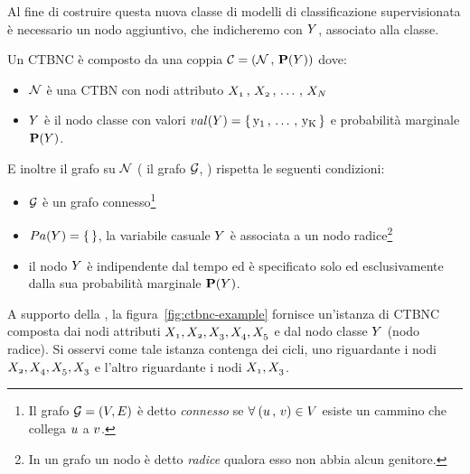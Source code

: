 Al fine di costruire questa nuova classe di modelli di classificazione supervisionata è necessario un nodo aggiuntivo, che indicheremo con $\mathnormal{Y}$, associato alla classe.
\begin{definizione}\label{defn:ctbnc}
Un \acf{CTBNC} è composto da una coppia $\mathcal{C}=(\mathcal{N}\,,\,\mathbf{P}(\mathnormal{Y}))$ dove:
\begin{itemize}
    \item $\mathcal{N}$ è una \acs{CTBN} con nodi attributo $\mathnormal{X_1}\,,\,\mathnormal{X_2}\,,\,\dotsc\,,\,\mathnormal{X_N}$
    \item $\mathnormal{Y}$ è il nodo classe con valori $val(\mathnormal{Y})=\{\,\mathrm{y_1}\,,\,\dotsc\,,\,\mathrm{y_K}\,\}$ e probabilità marginale $\mathbf{P}(\mathnormal{Y})$.
\end{itemize}
E inoltre il grafo su $\mathcal{N}$ (\ie{} il grafo $\mathcal{G}$, ) rispetta le seguenti condizioni:
\begin{itemize}
    \item $\mathcal{G}$ è un grafo connesso\footnote{Il grafo $\mathcal{G} = (\mathnormal{V}, \mathnormal{E})$ è detto \emph{connesso} se $\forall \: (\mathnormal{u}\,,\,\mathnormal{v}) \in \mathnormal{V}$ esiste un cammino che collega $\mathnormal{u}$ a $\mathnormal{v}$.}
    \item $Pa(\mathnormal{Y})=\{\,\}$, \ie{} la variabile casuale $\mathnormal{Y}$ è associata a un nodo radice\footnote{In un grafo un nodo è detto \emph{radice} qualora esso non abbia alcun genitore.}
    \item il nodo $\mathnormal{Y}$ è indipendente dal tempo ed è specificato solo ed esclusivamente dalla sua probabilità marginale $\mathbf{P}(\mathnormal{Y})$.
\end{itemize}
\end{definizione}
A supporto della , la figura~\vref{fig:ctbnc-example} fornisce un'istanza di \acs{CTBNC} composta dai nodi attributi $\mathnormal{X_1},\mathnormal{X_2},\mathnormal{X_3},\mathnormal{X_4},\mathnormal{X_5}$ e dal nodo classe $\mathnormal{Y}$ (nodo radice). Si osservi come tale istanza contenga dei cicli, uno riguardante i nodi $\mathnormal{X_2},\mathnormal{X_4},\mathnormal{X_5},\mathnormal{X_3}$ e l'altro riguardante i nodi $\mathnormal{X_1},\mathnormal{X_3}$.

